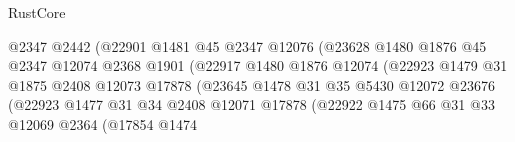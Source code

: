 \begin{lexlean}{RustCore}
\begin{coremodule}
                                        @2347
                                        @2442
                                        (@22901
                                          @1481
                                          @45
                                          @2347
                                          @12076
                                          (@23628
                                            @1480
                                            @1876
                                            @45
                                            @2347
                                            @12074
                                            @2368
                                            @1901
                                            (@22917
                                              @1480
                                              @1876
                                              @12074
                                              (@22923
                                                @1479
                                                @31
                                                @1875
                                                @2408
                                                @12073
                                                @17878
                                                (@23645
                                                  @1478
                                                  @31
                                                  @35
                                                  @5430
                                                  @12072
                                                  @23676
                                                  (@22923
                                                    @1477
                                                    @31
                                                    @34
                                                    @2408
                                                    @12071
                                                    @17878
                                                    (@22922
                                                      @1475
                                                      @66
                                                      @31
                                                      @33
                                                      @12069
                                                      @2364
                                                      (@17854
                                                        @1474

\end{coremodule}
\end{lexlean}
